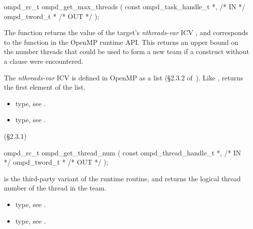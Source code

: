 \summary

\format
\cspecificstart
\begin{boxedcode}
ompd\_rc\_t ompd\_get\_max\_threads (
  const ompd\_task\_handle\_t  *,                           /* IN */
  ompd\_tword\_t              *                                   /* OUT */
); 
\end{boxedcode}
\cspecificend

\descr
The  function returns the value of the
target's \emph{nthreads-var} ICV ,
and corresponds to the  function
in the OpenMP runtime API.
This returns an upper bound on the number threads that could be used
to form a new team if a  construct without a
 clause were encountered.

The \emph{nthreads-var} ICV is defined in OpenMP as a list
(\S2.3.2 of~\cite{OpenMP}).
Like , 
returns the first element of the list.

\argdesc

\crossreferences
\begin{itemize}
	\item {} type, see .
	\item {} type, see .
\end{itemize}
(\S2.3.1)

\summary

\format
\cspecificstart
\begin{boxedcode}
ompd\_rc\_t ompd\_get\_thread\_num (
  const ompd\_thread\_handle\_t *,                       /* IN */
  ompd\_tword\_t *                                 /* OUT */
);
\end{boxedcode}
\cspecificend

\descr
{} is the third-party variant of the 
 runtime routine, and returns the logical
thread number of the thread in the team.


\argdesc

\crossreferences
\begin{itemize}
	\item {} type, see .
	\item {} type, see .
\end{itemize}


